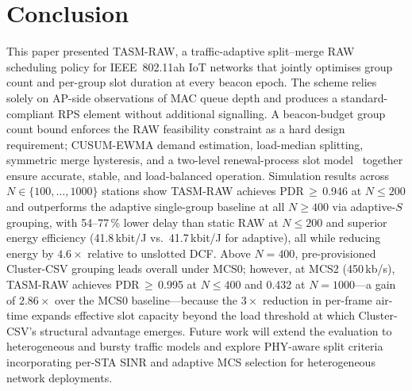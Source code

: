 \documentclass[conference]{IEEEtran}
\begin{document}
\section{Conclusion}
\label{sec:conc}

This paper presented TASM-RAW, a traffic-adaptive split--merge RAW
scheduling policy for IEEE~802.11ah IoT networks that jointly optimises
group count and per-group slot duration at every beacon epoch.
The scheme relies solely on AP-side observations of MAC queue depth and
produces a standard-compliant RPS element without additional signalling.
A beacon-budget group count bound enforces the RAW feasibility constraint
as a hard design requirement; CUSUM-EWMA demand estimation, load-median
splitting, symmetric merge hysteresis, and a two-level renewal-process
slot model~\cite{taramit2023} together ensure accurate, stable, and
load-balanced operation.
Simulation results across $N\!\in\!\{100,\ldots,1000\}$ stations show
TASM-RAW achieves PDR\,$\geq$\,0.946 at $N\!\leq\!200$ and outperforms
the adaptive single-group baseline at all $N\!\geq\!400$ via adaptive-$S$
grouping, with 54--77\,\% lower delay than static RAW at $N\!\leq\!200$
and superior energy efficiency (41.8\,kbit/J vs.\ 41.7\,kbit/J for adaptive),
all while reducing energy by $4.6\times$ relative to unslotted DCF.
Above $N\!=\!400$, pre-provisioned Cluster-CSV grouping leads overall
under MCS0; however, at MCS2 (450\,kb/s), TASM-RAW achieves
PDR\,$\geq$\,0.995 at $N\!\leq\!400$ and 0.432 at $N\!=\!1000$---a
gain of $2.86\times$ over the MCS0 baseline---because the $3\times$
reduction in per-frame air-time expands effective slot capacity beyond the
load threshold at which Cluster-CSV's structural advantage emerges.
Future work will extend the evaluation to heterogeneous and bursty traffic
models and explore PHY-aware split criteria incorporating per-STA SINR
and adaptive MCS selection for heterogeneous network deployments.
\end{document}
